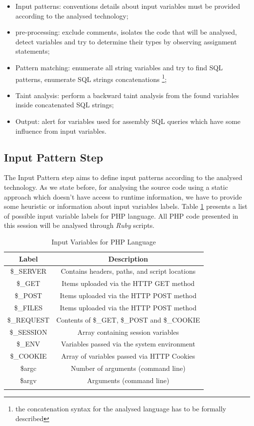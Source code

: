 \begin{itemize}
	\item Input patterns: conventions details about input variables must be provided according to the analysed technology;
	\item pre-processing: exclude comments, isolates the code that will be analysed, detect variables and try to determine their types by observing assignment statements;
	\item Pattern matching: enumerate all string variables and try to find SQL patterns, enumerate SQL strings concatenations \footnote{the concatenation syntax for the analysed language has to be formally described};
	\item Taint analysis: perform a backward taint analysis from the found variables inside concatenated SQL strings;
	\item Output: alert for variables used for assembly SQL queries which have some influence from input variables.
\end{itemize}  

\subsection{Input Pattern Step}

The Input Pattern step aims to define input patterns according to the analysed technology. As we state before, for analysing the source code using a static approach which doesn't have access to runtime information, we have to provide some heuristic or information about input variables labels. Table \ref{tab:input_variable_labels} presents a list of possible input variable labels for PHP language. All PHP code presented in this session will be analysed through \textit{Ruby} scripts.

\begin{table}[ht] 
\caption{Input Variables for PHP Language}
\centering
\begin{tabular}{c c}
\hline\hline
Label & Description \\ [0.5ex]
\hline
\$\_SERVER & Contains headers, paths, and script locations \\
\$\_GET & Items uploaded via the HTTP GET method\\
\$\_POST & Items uploaded via the HTTP POST method\\
\$\_FILES & Items uploaded via the HTTP POST method\\
\$\_REQUEST & Contents of \$\_GET, \$\_POST and \$\_COOKIE\\
\$\_SESSION & Array containing session variables\\
\$\_ENV &  Variables passed via the system environment\\
\$\_COOKIE & Array of variables passed via HTTP Cookies\\
\$argc & Number of arguments (command line)\\
\$argv & Arguments (command line)\\

\hline
\label{tab:input_variable_labels}
\end{tabular}
\end{table}

